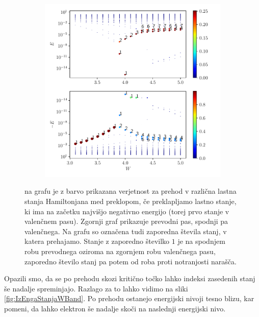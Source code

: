 \begin{figure}[!h]
\centering
\begin{subfigure}{.9\textwidth}
\includegraphics[width=\linewidth]{Figures/IzEngaStanja.pdf}
\end{subfigure}
\caption{na grafu je z barvo prikazana verjetnost za prehod v različna lastna stanja Hamiltonjana med preklopom, če preklapljamo lastno stanje, ki ima na začetku najvišjo negativno energijo (torej prvo stanje v valenčnem pasu). Zgornji graf prikazuje prevodni pas, spodnji pa valenčnega. Na grafu so označena tudi zaporedna števila stanj, v katera prehajamo. Stanje z zaporedno številko $1$ je na spodnjem robu prevodnega oziroma na zgornjem robu valenčnega pasu, zaporedno število stanj pa potem od roba proti notranjosti narašča.}
\label{fig:IzEngaStanja}
\end{figure}
\newpage
Opazili smo, da se po prehodu skozi kritično točko lahko indeksi zasedenih stanj še nadalje spreminjajo. Razlago za to lahko vidimo na sliki \ref{fig:IzEngaStanjaWBand}. Po prehodu ostanejo energijski nivoji tesno blizu, kar pomeni, da lahko elektron še nadalje skoči na naslednji energijski nivo.

